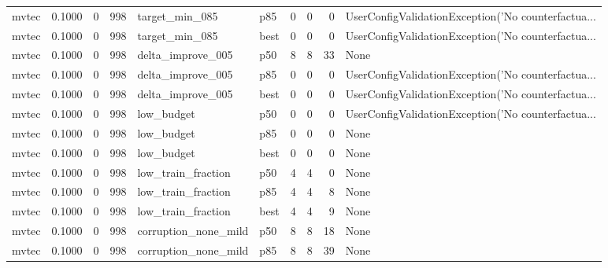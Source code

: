 \begin{tabular}{lrrrllrrrl}
   mvtec &    0.1000 &    0 &    998 &       target\_min\_085 &    p85 &               0 &          0 &       0 & UserConfigValidationException('No counterfactua... \\
   mvtec &    0.1000 &    0 &    998 &       target\_min\_085 &   best &               0 &          0 &       0 & UserConfigValidationException('No counterfactua... \\
   mvtec &    0.1000 &    0 &    998 &    delta\_improve\_005 &    p50 &               8 &          8 &      33 &                                               None \\
   mvtec &    0.1000 &    0 &    998 &    delta\_improve\_005 &    p85 &               0 &          0 &       0 & UserConfigValidationException('No counterfactua... \\
   mvtec &    0.1000 &    0 &    998 &    delta\_improve\_005 &   best &               0 &          0 &       0 & UserConfigValidationException('No counterfactua... \\
   mvtec &    0.1000 &    0 &    998 &           low\_budget &    p50 &               0 &          0 &       0 & UserConfigValidationException('No counterfactua... \\
   mvtec &    0.1000 &    0 &    998 &           low\_budget &    p85 &               0 &          0 &       0 &                                               None \\
   mvtec &    0.1000 &    0 &    998 &           low\_budget &   best &               0 &          0 &       0 &                                               None \\
   mvtec &    0.1000 &    0 &    998 &   low\_train\_fraction &    p50 &               4 &          4 &       0 &                                               None \\
   mvtec &    0.1000 &    0 &    998 &   low\_train\_fraction &    p85 &               4 &          4 &       8 &                                               None \\
   mvtec &    0.1000 &    0 &    998 &   low\_train\_fraction &   best &               4 &          4 &       9 &                                               None \\
   mvtec &    0.1000 &    0 &    998 & corruption\_none\_mild &    p50 &               8 &          8 &      18 &                                               None \\
   mvtec &    0.1000 &    0 &    998 & corruption\_none\_mild &    p85 &               8 &          8 &      39 &                                               None \\

\end{tabular}
